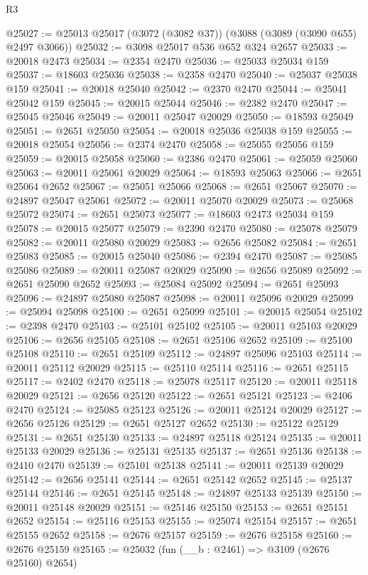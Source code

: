 \begin{lexlean}{R3}
\begin{coremodule}
@25027 := @25013 @25017 (@3072 (@3082 @37)) (@3088 (@3089 (@3090 @655) @2497 @3066))
@25032 := @3098 @25017 @536 @652 @324 @2657
@25033 := @20018 @2473
@25034 := @2354 @2470
@25036 := @25033 @25034 @159
@25037 := @18603 @25036
@25038 := @2358 @2470
@25040 := @25037 @25038 @159
@25041 := @20018 @25040
@25042 := @2370 @2470
@25044 := @25041 @25042 @159
@25045 := @20015 @25044
@25046 := @2382 @2470
@25047 := @25045 @25046
@25049 := @20011 @25047 @20029
@25050 := @18593 @25049
@25051 := @2651 @25050
@25054 := @20018 @25036 @25038 @159
@25055 := @20018 @25054
@25056 := @2374 @2470
@25058 := @25055 @25056 @159
@25059 := @20015 @25058
@25060 := @2386 @2470
@25061 := @25059 @25060
@25063 := @20011 @25061 @20029
@25064 := @18593 @25063
@25066 := @2651 @25064 @2652
@25067 := @25051 @25066
@25068 := @2651 @25067
@25070 := @24897 @25047 @25061
@25072 := @20011 @25070 @20029
@25073 := @25068 @25072
@25074 := @2651 @25073
@25077 := @18603 @2473 @25034 @159
@25078 := @20015 @25077
@25079 := @2390 @2470
@25080 := @25078 @25079
@25082 := @20011 @25080 @20029
@25083 := @2656 @25082
@25084 := @2651 @25083
@25085 := @20015 @25040
@25086 := @2394 @2470
@25087 := @25085 @25086
@25089 := @20011 @25087 @20029
@25090 := @2656 @25089
@25092 := @2651 @25090 @2652
@25093 := @25084 @25092
@25094 := @2651 @25093
@25096 := @24897 @25080 @25087
@25098 := @20011 @25096 @20029
@25099 := @25094 @25098
@25100 := @2651 @25099
@25101 := @20015 @25054
@25102 := @2398 @2470
@25103 := @25101 @25102
@25105 := @20011 @25103 @20029
@25106 := @2656 @25105
@25108 := @2651 @25106 @2652
@25109 := @25100 @25108
@25110 := @2651 @25109
@25112 := @24897 @25096 @25103
@25114 := @20011 @25112 @20029
@25115 := @25110 @25114
@25116 := @2651 @25115
@25117 := @2402 @2470
@25118 := @25078 @25117
@25120 := @20011 @25118 @20029
@25121 := @2656 @25120
@25122 := @2651 @25121
@25123 := @2406 @2470
@25124 := @25085 @25123
@25126 := @20011 @25124 @20029
@25127 := @2656 @25126
@25129 := @2651 @25127 @2652
@25130 := @25122 @25129
@25131 := @2651 @25130
@25133 := @24897 @25118 @25124
@25135 := @20011 @25133 @20029
@25136 := @25131 @25135
@25137 := @2651 @25136
@25138 := @2410 @2470
@25139 := @25101 @25138
@25141 := @20011 @25139 @20029
@25142 := @2656 @25141
@25144 := @2651 @25142 @2652
@25145 := @25137 @25144
@25146 := @2651 @25145
@25148 := @24897 @25133 @25139
@25150 := @20011 @25148 @20029
@25151 := @25146 @25150
@25153 := @2651 @25151 @2652
@25154 := @25116 @25153
@25155 := @25074 @25154
@25157 := @2651 @25155 @2652
@25158 := @2676 @25157
@25159 := @2676 @25158
@25160 := @2676 @25159
@25165 := @25032 (fun (__b : @2461) => @3109 (@2676 @25160) @2654)

\end{coremodule}
\end{lexlean}
